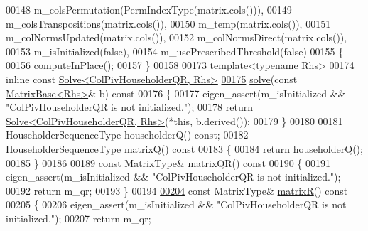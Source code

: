 \begin{DoxyCode}
00148         m\_colsPermutation(PermIndexType(matrix.cols())),
00149         m\_colsTranspositions(matrix.cols()),
00150         m\_temp(matrix.cols()),
00151         m\_colNormsUpdated(matrix.cols()),
00152         m\_colNormsDirect(matrix.cols()),
00153         m\_isInitialized(false),
00154         m\_usePrescribedThreshold(false)
00155     \{
00156       computeInPlace();
00157     \}
00158 
00173     \textcolor{keyword}{template}<\textcolor{keyword}{typename} Rhs>
00174     \textcolor{keyword}{inline} \textcolor{keyword}{const} \hyperlink{group___core___module_class_eigen_1_1_solve}{Solve<ColPivHouseholderQR, Rhs>}
\hyperlink{group___q_r___module_aaa9c4af89930ab3bb7612ed9ae33d3f5}{00175}     \hyperlink{group___q_r___module_aaa9c4af89930ab3bb7612ed9ae33d3f5}{solve}(\textcolor{keyword}{const} \hyperlink{group___core___module_class_eigen_1_1_matrix_base}{MatrixBase<Rhs>}& b)\textcolor{keyword}{ const}
00176 \textcolor{keyword}{    }\{
00177       eigen\_assert(m\_isInitialized && \textcolor{stringliteral}{"ColPivHouseholderQR is not initialized."});
00178       \textcolor{keywordflow}{return} \hyperlink{group___core___module_class_eigen_1_1_solve}{Solve<ColPivHouseholderQR, Rhs>}(*\textcolor{keyword}{this}, b.derived());
00179     \}
00180 
00181     HouseholderSequenceType householderQ() \textcolor{keyword}{const};
00182     HouseholderSequenceType matrixQ()\textcolor{keyword}{ const}
00183 \textcolor{keyword}{    }\{
00184       \textcolor{keywordflow}{return} householderQ();
00185     \}
00186 
\hyperlink{group___q_r___module_aa572ac050c8d4fadd4f08a87f6b1e62b}{00189}     \textcolor{keyword}{const} MatrixType& \hyperlink{group___q_r___module_aa572ac050c8d4fadd4f08a87f6b1e62b}{matrixQR}()\textcolor{keyword}{ const}
00190 \textcolor{keyword}{    }\{
00191       eigen\_assert(m\_isInitialized && \textcolor{stringliteral}{"ColPivHouseholderQR is not initialized."});
00192       \textcolor{keywordflow}{return} m\_qr;
00193     \}
00194 
\hyperlink{group___q_r___module_a44c534d47bde6b67ce4b5247d142ef30}{00204}     \textcolor{keyword}{const} MatrixType& \hyperlink{group___q_r___module_a44c534d47bde6b67ce4b5247d142ef30}{matrixR}()\textcolor{keyword}{ const}
00205 \textcolor{keyword}{    }\{
00206       eigen\_assert(m\_isInitialized && \textcolor{stringliteral}{"ColPivHouseholderQR is not initialized."});
00207       \textcolor{keywordflow}{return} m\_qr;

\end{DoxyCode}
